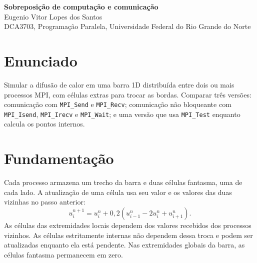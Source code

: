 \documentclass[11pt,letterpaper]{article}
\begin{document}
\pagestyle{plain}
\begin{center}
{\LARGE\bfseries Sobreposição de computação e comunicação}\\[0.4em]
{\normalsize Eugenio Vitor Lopes dos Santos}\\[0.3em]
{\small DCA3703, Programação Paralela, Universidade Federal do Rio Grande do Norte}
\end{center}

\section{Enunciado}
Simular a difusão de calor em uma barra 1D distribuída entre dois ou mais processos MPI, com células extras para trocar as bordas. Comparar três versões: comunicação com \texttt{MPI\_Send} e \texttt{MPI\_Recv}; comunicação não bloqueante com \texttt{MPI\_Isend}, \texttt{MPI\_Irecv} e \texttt{MPI\_Wait}; e uma versão que usa \texttt{MPI\_Test} enquanto calcula os pontos internos.

\section{Fundamentação}
Cada processo armazena um trecho da barra e duas células fantasma, uma de cada lado. A atualização de uma célula usa seu valor e os valores das duas vizinhas no passo anterior:
\[
u_i^{n+1}=u_i^n+0{,}2\left(u_{i-1}^n-2u_i^n+u_{i+1}^n\right).
\]
As células das extremidades locais dependem dos valores recebidos dos processos vizinhos. As células estritamente internas não dependem dessa troca e podem ser atualizadas enquanto ela está pendente. Nas extremidades globais da barra, as células fantasma permanecem em zero.
\end{document}
